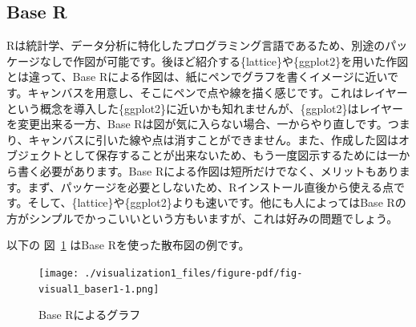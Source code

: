 \documentclass[
  a4paper,
  pandoc,
  ja=standard,
  jafont=haranoaji]{bxjsbook}
\newenvironment{Shaded}{\begin{snugshade}}{\end{snugshade}}
\newcommand{\AttributeTok}[1]{\textcolor[rgb]{0.00,0.48,0.65}{#1}}
\newcommand{\CommentTok}[1]{\textcolor[rgb]{0.37,0.37,0.37}{#1}}
\newcommand{\DecValTok}[1]{\textcolor[rgb]{0.68,0.00,0.00}{#1}}
\newcommand{\FunctionTok}[1]{\textcolor[rgb]{0.28,0.35,0.67}{#1}}
\newcommand{\NormalTok}[1]{\textcolor[rgb]{0.00,0.48,0.65}{#1}}
\newcommand{\SpecialCharTok}[1]{\textcolor[rgb]{0.37,0.37,0.37}{#1}}
\newcommand{\StringTok}[1]{\textcolor[rgb]{0.13,0.47,0.30}{#1}}
\begin{document}
\hypertarget{base-r}{%
\subsection{Base R}\label{base-r}}

Rは統計学、データ分析に特化したプログラミング言語であるため、別途のパッケージなしで作図が可能です。後ほど紹介する\{lattice\}や\{ggplot2\}を用いた作図とは違って、Base
Rによる作図は、紙にペンでグラフを書くイメージに近いです。キャンバスを用意し、そこにペンで点や線を描く感じです。これはレイヤーという概念を導入した\{ggplot2\}に近いかも知れませんが、\{ggplot2\}はレイヤーを変更出来る一方、Base
Rは図が気に入らない場合、一からやり直しです。つまり、キャンバスに引いた線や点は消すことができません。また、作成した図はオブジェクトとして保存することが出来ないため、もう一度図示するためには一から書く必要があります。Base
Rによる作図は短所だけでなく、メリットもあります。まず、パッケージを必要としないため、Rインストール直後から使える点です。そして、\{lattice\}や\{ggplot2\}よりも速いです。他にも人によってはBase
Rの方がシンプルでかっこいいという方もいますが、これは好みの問題でしょう。

以下の 図~\ref{fig-visual1_baser1} はBase Rを使った散布図の例です。

\begin{Shaded}
\end{Shaded}

\begin{figure}[H]

{\centering \texttt{[image: ./visualization1\_files/figure-pdf/fig-visual1\_baser1-1.png]}

}

\caption{\label{fig-visual1_baser1}Base Rによるグラフ}

\end{figure}
\end{document}
